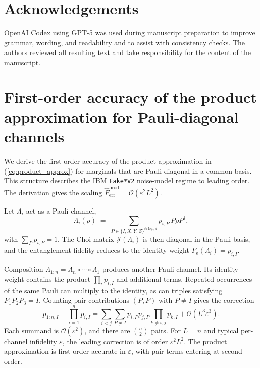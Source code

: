 \documentclass[12pt]{iopart}
\providecommand{\eqref}[1]{(\ref{#1})}
\providecommand{\binom}[2]{{#1\choose #2}}
\newcommand{\Fe}{F_{\mathrm{e}}}
\newcommand{\Fhat}{\widehat{F}}
\newcommand{\Choi}{\mathcal{J}}
\newcommand{\Lset}{\Lambda}
\newcommand{\eps}{\varepsilon}
\begin{document}
\section*{Acknowledgements}

OpenAI Codex using GPT-5 was used during manuscript preparation to improve grammar, wording, and readability and to assist with consistency checks. The authors reviewed all resulting text and take responsibility for the content of the manuscript.

\appendix

\section{First-order accuracy of the product approximation for Pauli-diagonal channels}
\label{app:pauli}

We derive the first-order accuracy of the product approximation in \eqref{eq:product_approx} for marginals that are Pauli-diagonal in a common basis. This structure describes the IBM \texttt{Fake*V2} noise-model regime to leading order. The derivation gives the scaling $\Fhat^{\mathrm{prod}}_{\mathrm{err}} = \mathcal{O}(\eps^{2} L^{2})$.

Let $\Lset_i$ act as a Pauli channel,
\begin{equation}
\Lset_i(\rho) \;=\; \sum_{P \in \{I, X, Y, Z\}^{\otimes \log_2 d}} p_{i,P} \, P \rho P^{\dagger},
\end{equation}
with $\sum_P p_{i,P} = 1$. The Choi matrix $\Choi(\Lset_i)$ is then diagonal in the Pauli basis, and the entanglement fidelity reduces to the identity weight $\Fe(\Lset_i) = p_{i, I}$.

Composition $\Lset_{1:n}=\Lset_n\circ\cdots\circ\Lset_1$ produces another Pauli channel. Its identity weight contains the product $\prod_i p_{i,I}$ and additional terms. Repeated occurrences of the same Pauli can multiply to the identity, as can triples satisfying $P_1P_2P_3=I$. Counting pair contributions $(P,P)$ with $P\neq I$ gives the correction
\begin{equation}
p_{1:n,I}-\prod_{i=1}^{n}p_{i,I}=\sum_{i<j}\sum_{P\neq I}p_{i,P}p_{j,P}\!\prod_{k\neq i,j}p_{k,I}+\mathcal{O}(L^{3}\eps^{3}).
\end{equation}
Each summand is $\mathcal{O}(\eps^{2})$, and there are $\binom{n}{2}$ pairs. For $L=n$ and typical per-channel infidelity $\eps$, the leading correction is of order $\eps^{2}L^{2}$. The product approximation is first-order accurate in $\eps$, with pair terms entering at second order.
\end{document}
